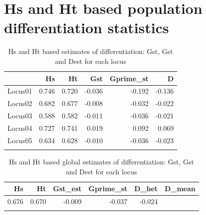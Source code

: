 \documentclass[a4paper]{scrartcl}\usepackage[]{graphicx}\usepackage[]{color}
\begin{document}
\FloatBarrier


\section{Hs and Ht based population differentiation statistics}



\begin{table}[ht]
\centering
\begin{tabular}{rrrrrr}
  \hline
 & Hs & Ht & Gst & Gprime\_st & D \\ 
  \hline
Locus01 & 0.746 & 0.720 & -0.036 & -0.192 & -0.136 \\ 
   \rowcolor[gray]{0.9} Locus02 & 0.682 & 0.677 & -0.008 & -0.032 & -0.022 \\ 
  Locus03 & 0.588 & 0.582 & -0.011 & -0.036 & -0.021 \\ 
   \rowcolor[gray]{0.9} Locus04 & 0.727 & 0.741 & 0.019 & 0.092 & 0.069 \\ 
  Locus05 & 0.634 & 0.628 & -0.010 & -0.036 & -0.023 \\ 
   \rowcolor[gray]{0.9}  \hline
\end{tabular}
\caption{Hs and Ht based estimates of differentiation: Gst, Gst and Dest for each locus} 
\end{table}
\begin{table}[ht]
\centering
\begin{tabular}{rrrrrr}
  \hline
Hs & Ht & Gst\_est & Gprime\_st & D\_het & D\_mean \\ 
  \hline
0.676 & 0.670 & -0.009 & -0.037 & -0.024 &  \\ 
   \rowcolor[gray]{0.9}  \hline
\end{tabular}
\caption{Hs and Ht based global estimates of differentiation: Gst, Gst and Dest for each locus} 
\end{table}
\end{document}
